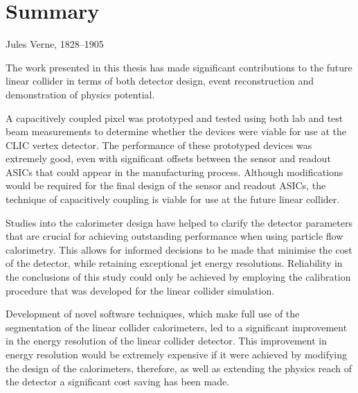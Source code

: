 \chapter{Summary}
\label{chap:summary}

{Jules Verne, 1828--1905}



The work presented in this thesis has made significant contributions to the future linear collider in terms of both detector design, event reconstruction and demonstration of physics potential.  

A capacitively coupled pixel was prototyped and tested using both lab and test beam measurements to determine whether the devices were viable for use at the CLIC vertex detector.  The performance of these prototyped devices was extremely good, even with significant offsets between the sensor and readout ASICs that could appear in the manufacturing process.  Although modifications would be required for the final design of the sensor and readout ASICs, the technique of capacitively coupling is viable for use at the future linear collider.  

Studies into the calorimeter design have helped to clarify the detector parameters that are crucial for achieving outstanding performance when using particle flow calorimetry.  This allows for informed decisions to be made that minimise the cost of the detector, while retaining exceptional jet energy resolutions.  Reliability in the conclusions of this study could only be achieved by employing the calibration procedure that was developed for the linear collider simulation.  

Development of novel software techniques, which make full use of the segmentation of the linear collider calorimeters, led to a significant improvement in the energy resolution of the linear collider detector.  This improvement in energy resolution would be extremely expensive if it were achieved by modifying the design of the calorimeters, therefore, as well as extending the physics reach of the detector a significant cost saving has been made.   

